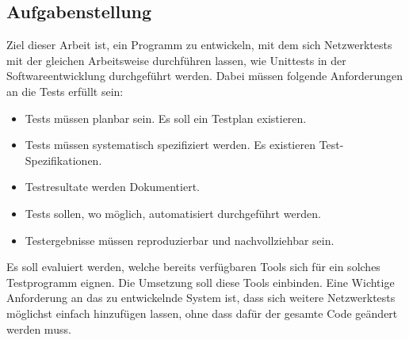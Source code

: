 \documentclass[]{subfiles}
\begin{document}
    \subsection{Aufgabenstellung}
    \label{subsec:Aufgabenstellung}
    Ziel dieser Arbeit ist, ein Programm zu entwickeln, mit dem sich Netzwerktests mit 
    der gleichen Arbeitsweise durchführen lassen, wie Unittests in der Softwareentwicklung
    durchgeführt werden. Dabei müssen folgende Anforderungen an die Tests erfüllt sein:
    \begin{itemize}
        \item Tests müssen planbar sein. Es soll ein Testplan existieren.
        \item Tests müssen systematisch spezifiziert werden. Es existieren Test-Spezifikationen.
        \item Testresultate werden Dokumentiert.
        \item Tests sollen, wo möglich, automatisiert durchgeführt werden.
        \item Testergebnisse müssen reproduzierbar und nachvollziehbar sein.
    \end{itemize}
    Es soll evaluiert werden, welche bereits verfügbaren Tools sich für ein solches Testprogramm
    eignen. Die Umsetzung soll diese Tools einbinden.
    Eine Wichtige Anforderung an das zu entwickelnde System ist, dass sich weitere 
    Netzwerktests möglichst einfach hinzufügen lassen, ohne dass dafür der gesamte Code
    geändert werden muss. 
    
\end{document}
